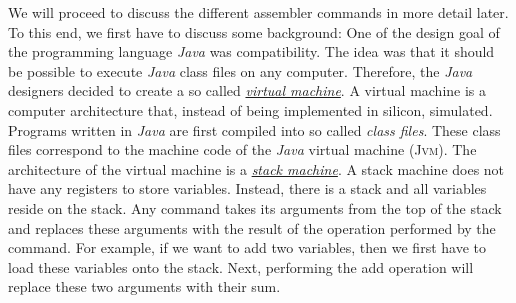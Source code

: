 We will proceed to discuss the different assembler commands in more detail later.  To this end, we
first have to discuss some background: One of the design goal of the programming language
\textsl{Java} was compatibility.  The idea was 
that it should be possible to execute \textsl{Java} class files on any computer.  Therefore, the
\textsl{Java} designers decided to create a so called 
\href{http://en.wikipedia.org/wiki/Virtual_machine}{\emph{virtual machine}}.  A virtual machine is
a computer architecture that, instead of being implemented in silicon, simulated. 
Programs written in \textsl{Java} are first compiled into so called \emph{class files}.  These class
files correspond to the machine code of the \textsl{Java} virtual machine (\textsc{Jvm}).  
The architecture of the virtual machine is a 
\href{http://en.wikipedia.org/wiki/Stack_machine}{\emph{stack machine}}. 
A stack machine does not have any registers to store variables.  Instead, there is a stack and all
variables reside on the stack.  Any command takes its arguments from the top of the stack and
replaces these arguments with the result of the operation performed by the command.
For example, if we want to add two variables, then we first have to
load these variables onto the stack.  Next, performing the add operation will replace these two
arguments with their sum.


